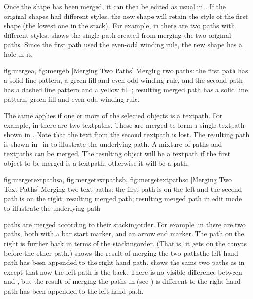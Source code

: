Once the shape has been merged, it can then be edited as usual in
\editpathmode.  If the original shapes had different styles, the new
shape will retain the style of the first shape (the lowest one in
the \gls{stack}). For example, in  there are
two \glspl{path} with different styles.  shows
the single \gls{path} created from merging the two original paths.
Since the first path used the even-odd winding rule, the new shape
has a hole in it.

{
  {fig:mergea}{}{},
  {fig:mergeb}{}{}
}
[Merging Two Paths]
{Merging two paths:
 the first path has a solid line pattern, a
green fill  and even-odd winding rule, and the second
path has a dashed line pattern and a yellow fill ;
 resulting merged path has a solid line
pattern, green fill  and even-odd winding rule.}

The same applies if one or more of the selected \glspl*{object} is a
\gls{textpath}. For example, in 
there are two \glspl*{textpath}.  These are merged to form a single
\gls*{textpath} shown in . Note that
the text from the second \gls{textpath} is lost. The resulting path
is shown in \editpathmode\ in  to
illustrate the underlying path. A mixture of \glspl*{path} and
\glspl*{textpath} can be merged. The resulting \gls*{object} will be
a \gls*{textpath} if the first object to be merged is a
\gls*{textpath}, otherwise it will be a \gls*{path}.

{
  {fig:mergetextpathsa}{}{},
  {fig:mergetextpathsb}{}{},
  {fig:mergetextpathsc}{}{}
}
[Merging Two Text-Paths]
{Merging two text-paths:
 the first path is on the left and
the second path is on the right;
 resulting merged path;
 resulting merged path in
edit mode to illustrate the underlying path}

\Glspl{path} are merged according to their \gls{stackingorder}. For
example, in  there are two \glspl{path}, both
with a bar start marker, and an arrow end marker. The path on the
right is further back in terms of the \gls{stackingorder}. (That is,
it gets  on the \gls{canvas} before the
other path.)  shows the result of merging the
two paths\dash the left hand path has been appended to the right
hand path.  shows the same two paths as in
 except that now the left path is the
\gls{back}. There is no visible difference between
 and , but the result
of merging the paths in  (see
) is different to
\dash the right hand path has been appended
to the left hand path.

